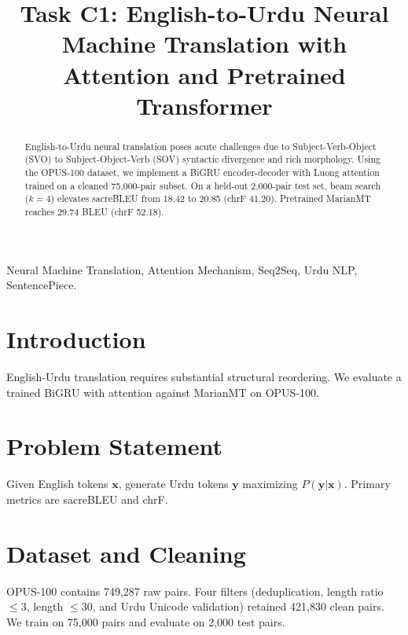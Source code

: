 \documentclass[conference]{IEEEtran}
\begin{document}
\title{Task C1: English-to-Urdu Neural Machine Translation with Attention and Pretrained Transformer}

\author{
}

\maketitle

\begin{abstract}
English-to-Urdu neural translation poses acute challenges due to Subject-Verb-Object (SVO) to Subject-Object-Verb (SOV) syntactic divergence and rich morphology. Using the OPUS-100 dataset, we implement a BiGRU encoder-decoder with Luong attention trained on a cleaned 75,000-pair subset. On a held-out 2,000-pair test set, beam search ($k=4$) elevates sacreBLEU from 18.42 to 20.85 (chrF 41.20). Pretrained MarianMT reaches 29.74 BLEU (chrF 52.18).
\end{abstract}

\begin{IEEEkeywords}
Neural Machine Translation, Attention Mechanism, Seq2Seq, Urdu NLP, SentencePiece.
\end{IEEEkeywords}

\section{Introduction}
English-Urdu translation requires substantial structural reordering. We evaluate a trained BiGRU with attention against MarianMT on OPUS-100.

\section{Problem Statement}
Given English tokens $\mathbf{x}$, generate Urdu tokens $\mathbf{y}$ maximizing $P(\mathbf{y}|\mathbf{x})$. Primary metrics are sacreBLEU and chrF.

\section{Dataset and Cleaning}
OPUS-100 contains 749,287 raw pairs. Four filters (deduplication, length ratio $\le 3$, length $\le 30$, and Urdu Unicode validation) retained 421,830 clean pairs. We train on 75,000 pairs and evaluate on 2,000 test pairs.
\end{document}
